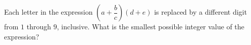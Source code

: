 Each letter in the expression $\left(a+\dfrac{b}{c}\right)(d+e)$ is replaced by a different digit from $1$ through $9$, inclusive. What is the smallest possible integer value of the expression?
